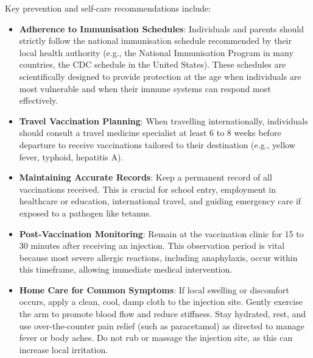 Key prevention and self-care recommendations include:
\begin{itemize}
    \item \textbf{Adherence to Immunisation Schedules}: Individuals and parents should strictly follow the national immunisation schedule recommended by their local health authority (e.g., the National Immunisation Program in many countries, the CDC schedule in the United States). These schedules are scientifically designed to provide protection at the age when individuals are most vulnerable and when their immune systems can respond most effectively.
    \item \textbf{Travel Vaccination Planning}: When travelling internationally, individuals should consult a travel medicine specialist at least 6 to 8 weeks before departure to receive vaccinations tailored to their destination (e.g., yellow fever, typhoid, hepatitis A).
    \item \textbf{Maintaining Accurate Records}: Keep a permanent record of all vaccinations received. This is crucial for school entry, employment in healthcare or education, international travel, and guiding emergency care if exposed to a pathogen like tetanus.
    \item \textbf{Post-Vaccination Monitoring}: Remain at the vaccination clinic for 15 to 30 minutes after receiving an injection. This observation period is vital because most severe allergic reactions, including anaphylaxis, occur within this timeframe, allowing immediate medical intervention.
    \item \textbf{Home Care for Common Symptoms}: If local swelling or discomfort occurs, apply a clean, cool, damp cloth to the injection site. Gently exercise the arm to promote blood flow and reduce stiffness. Stay hydrated, rest, and use over-the-counter pain relief (such as paracetamol) as directed to manage fever or body aches. Do not rub or massage the injection site, as this can increase local irritation.
\end{itemize}

